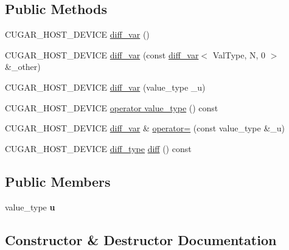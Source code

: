\subsection*{Public Methods}
\begin{DoxyCompactItemize}
\item 
C\+U\+G\+A\+R\+\_\+\+H\+O\+S\+T\+\_\+\+D\+E\+V\+I\+CE \hyperlink{structcugar_1_1diff__var_3_01_val_type_00_01_n_00_010_01_4_a139cf69ae5c62f061ebd50caba4574ba}{diff\+\_\+var} ()
\item 
C\+U\+G\+A\+R\+\_\+\+H\+O\+S\+T\+\_\+\+D\+E\+V\+I\+CE \hyperlink{structcugar_1_1diff__var_3_01_val_type_00_01_n_00_010_01_4_ad5a4448d6e691d1d15af2a05936c6dc5}{diff\+\_\+var} (const \hyperlink{structcugar_1_1diff__var}{diff\+\_\+var}$<$ Val\+Type, N, 0 $>$ \&\+\_\+other)
\item 
C\+U\+G\+A\+R\+\_\+\+H\+O\+S\+T\+\_\+\+D\+E\+V\+I\+CE \hyperlink{structcugar_1_1diff__var_3_01_val_type_00_01_n_00_010_01_4_a329ee3199e0e1b74e6980d77ac096f4d}{diff\+\_\+var} (value\+\_\+type \+\_\+u)
\item 
C\+U\+G\+A\+R\+\_\+\+H\+O\+S\+T\+\_\+\+D\+E\+V\+I\+CE \hyperlink{structcugar_1_1diff__var_3_01_val_type_00_01_n_00_010_01_4_a459196a06c30439af04cbc2777d82618}{operator value\+\_\+type} () const
\item 
C\+U\+G\+A\+R\+\_\+\+H\+O\+S\+T\+\_\+\+D\+E\+V\+I\+CE \hyperlink{structcugar_1_1diff__var}{diff\+\_\+var} \& \hyperlink{structcugar_1_1diff__var_3_01_val_type_00_01_n_00_010_01_4_aed5199dc2a41d96e395e3dc1384afda5}{operator=} (const value\+\_\+type \&\+\_\+u)
\item 
C\+U\+G\+A\+R\+\_\+\+H\+O\+S\+T\+\_\+\+D\+E\+V\+I\+CE \hyperlink{structcugar_1_1_vector}{diff\+\_\+type} \hyperlink{structcugar_1_1diff__var_3_01_val_type_00_01_n_00_010_01_4_a84a60225546646625806f4c280c3071d}{diff} () const
\end{DoxyCompactItemize}
\subsection*{Public Members}
\begin{DoxyCompactItemize}
\item 
\mbox{\label{structcugar_1_1diff__var_3_01_val_type_00_01_n_00_010_01_4_a31bfe25217b227819fcd3fd35489bf7c}} 
value\+\_\+type {\bfseries u}
\end{DoxyCompactItemize}


\subsection{Constructor \& Destructor Documentation}
\mbox{\label{structcugar_1_1diff__var_3_01_val_type_00_01_n_00_010_01_4_a139cf69ae5c62f061ebd50caba4574ba}} 
